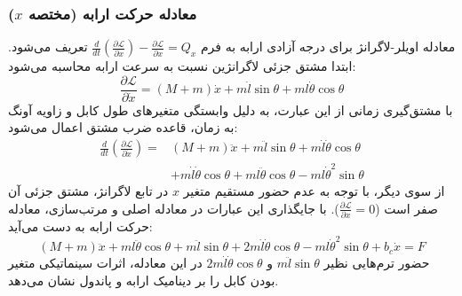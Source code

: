 \subsubsection{معادله حرکت ارابه (مختصه $x$)}
معادله اویلر-لاگرانژ برای درجه آزادی ارابه به فرم $\frac{d}{dt}\left(\frac{\partial \mathcal{L}}{\partial \dot{x}}\right) - \frac{\partial \mathcal{L}}{\partial x} = Q_x$ تعریف می‌شود. ابتدا مشتق جزئی لاگرانژین نسبت به سرعت ارابه محاسبه می‌شود:
\begin{equation}
    \frac{\partial \mathcal{L}}{\partial \dot{x}} = (M+m)\dot{x} + m\dot{l}\sin\theta + ml\dot{\theta}\cos\theta
\end{equation}
با مشتق‌گیری زمانی از این عبارت، به دلیل وابستگی متغیرهای طول کابل و زاویه آونگ به زمان، قاعده ضرب مشتق اعمال می‌شود:
\begin{equation}
    \begin{split}
        \frac{d}{dt}\left(\frac{\partial \mathcal{L}}{\partial \dot{x}}\right) ={} & (M+m)\ddot{x} + m\ddot{l}\sin\theta + m\dot{l}\dot{\theta}\cos\theta                      \\
                                                                                   & + m\dot{l}\dot{\theta}\cos\theta + ml\ddot{\theta}\cos\theta - ml\dot{\theta}^2\sin\theta
    \end{split}
\end{equation}
از سوی دیگر، با توجه به عدم حضور مستقیم متغیر $x$ در تابع لاگرانژ، مشتق جزئی آن صفر است ($\frac{\partial \mathcal{L}}{\partial x} = 0$). با جایگذاری این عبارات در معادله اصلی و مرتب‌سازی، معادله حرکت ارابه به دست می‌آید:
\begin{equation}
    (M+m)\ddot{x} + ml\ddot{\theta}\cos\theta + m\ddot{l}\sin\theta + 2m\dot{l}\dot{\theta}\cos\theta - ml\dot{\theta}^2\sin\theta + b_c\dot{x} = F
\end{equation}
حضور ترم‌هایی نظیر $m\ddot{l}\sin\theta$ و $2m\dot{l}\dot{\theta}\cos\theta$ در این معادله، اثرات سینماتیکی متغیر بودن کابل را بر دینامیک ارابه و پاندول نشان می‌دهد.

